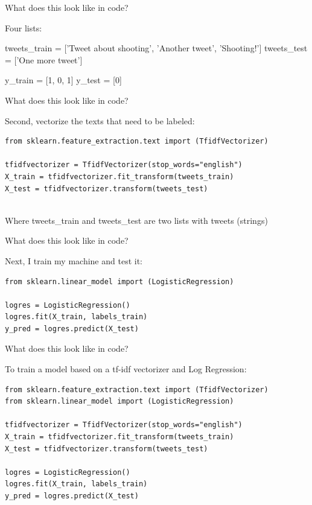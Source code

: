 \documentclass[compress]{beamer}
\begin{document}
\begin{frame}[fragile]{What does this look like in code?}
	
Four lists: 
	
\begin{lstlistingoutput}

tweets_train = ['Tweet about shooting', 'Another tweet', 'Shooting!']
tweets_test = ['One more tweet']

y_train = [1, 0, 1]	
y_test = [0]	

\end{lstlistingoutput}
\end{frame}



\begin{frame}[fragile]{What does this look like in code?}
	
Second, vectorize the texts that need to be labeled: 
	
\begin{lstlisting}
from sklearn.feature_extraction.text import (TfidfVectorizer)
		
tfidfvectorizer = TfidfVectorizer(stop_words="english")
X_train = tfidfvectorizer.fit_transform(tweets_train)
X_test = tfidfvectorizer.transform(tweets_test)
		
\end{lstlisting}
	
Where tweets\_train and tweets\_test are two lists with tweets (strings)
	
\end{frame}


\begin{frame}[fragile]{What does this look like in code?}
	
Next, I train my machine and test it: 
	
\begin{lstlisting}
from sklearn.linear_model import (LogisticRegression)
		
logres = LogisticRegression()
logres.fit(X_train, labels_train)
y_pred = logres.predict(X_test)
\end{lstlisting}
\end{frame}


\begin{frame}[fragile]{What does this look like in code?}
	
To train a model based on a tf-idf vectorizer and Log Regression:
	
\begin{lstlisting}
from sklearn.feature_extraction.text import (TfidfVectorizer)
from sklearn.linear_model import (LogisticRegression)
		
tfidfvectorizer = TfidfVectorizer(stop_words="english")
X_train = tfidfvectorizer.fit_transform(tweets_train)
X_test = tfidfvectorizer.transform(tweets_test)
		
logres = LogisticRegression()
logres.fit(X_train, labels_train)
y_pred = logres.predict(X_test)
\end{lstlisting}
	
\end{frame}
\end{document}
